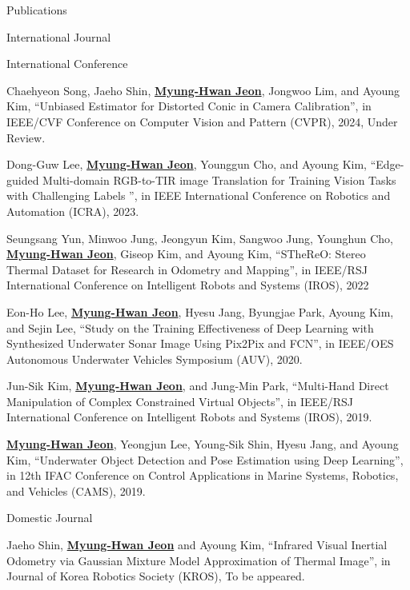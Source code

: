 \begin{rSection}{Publications}
\begin{pubSubsection}{International Journal}
\end{pubSubsection}

\begin{pubSubsection}{International Conference}

  \item Chaehyeon Song, Jaeho Shin, \underline{\textbf{Myung-Hwan Jeon}}, Jongwoo Lim, and Ayoung Kim, “Unbiased Estimator for Distorted Conic in Camera Calibration”, in IEEE/CVF Conference on Computer Vision and Pattern (CVPR), 2024, Under Review.

  \item Dong-Guw Lee, \underline{\textbf{Myung-Hwan Jeon}}, Younggun Cho, and Ayoung Kim, “Edge-guided Multi-domain RGB-to-TIR image Translation for Training Vision Tasks with Challenging Labels ”, in IEEE International Conference on Robotics and Automation (ICRA), 2023.

  \item Seungsang Yun, Minwoo Jung, Jeongyun Kim, Sangwoo Jung, Younghun Cho, \underline{\textbf{Myung-Hwan Jeon}}, Giseop Kim, and Ayoung Kim, “STheReO: Stereo Thermal Dataset for Research in Odometry and Mapping”, in IEEE/RSJ International Conference on Intelligent Robots and Systems (IROS), 2022
  
  \item Eon-Ho Lee, \underline{\textbf{Myung-Hwan Jeon}}, Hyesu Jang, Byungjae Park, Ayoung Kim, and Sejin Lee, “Study on the Training Effectiveness of Deep Learning with Synthesized Underwater Sonar Image Using Pix2Pix and FCN”, in IEEE/OES Autonomous Underwater Vehicles Symposium (AUV), 2020.
  
  \item Jun-Sik Kim, \underline{\textbf{Myung-Hwan Jeon}}, and Jung-Min Park, “Multi-Hand Direct Manipulation of Complex Constrained Virtual Objects”, in IEEE/RSJ International Conference on Intelligent Robots and Systems (IROS), 2019.
  
  \item \underline{\textbf{Myung-Hwan Jeon}}, Yeongjun Lee, Young-Sik Shin, Hyesu Jang, and Ayoung Kim, “Underwater Object Detection and Pose Estimation using Deep Learning”, in 12th IFAC Conference on Control Applications in Marine Systems, Robotics, and Vehicles (CAMS), 2019.

\end{pubSubsection}

\begin{pubSubsection}{Domestic Journal}

  \item Jaeho Shin, \underline{\textbf{Myung-Hwan Jeon}} and Ayoung Kim, “Infrared Visual Inertial Odometry via Gaussian Mixture Model Approximation of Thermal Image”, in Journal of Korea Robotics Society (KROS), To be appeared.
  

\end{pubSubsection}
\end{rSection}
